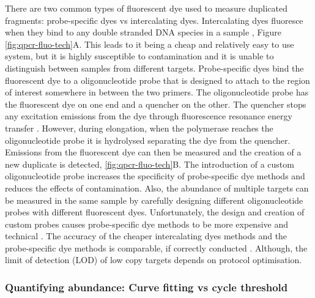\documentclass[../main.tex]{subfiles}
\begin{document}

There are two common types of fluorescent dye used to measure duplicated fragments: probe-specific dyes vs intercalating dyes.
Intercalating dyes fluoresce when they bind to any double stranded DNA species in a sample \parencite{Ihmels2005}, Figure \ref{fig:qpcr-fluo-tech}A.
This leads to it being a cheap and relatively easy to use system, but it is highly susceptible to contamination and it is unable to distinguish between samples from different targets. 
Probe-specific dyes bind the fluorescent dye to a oligonucleotide probe that is designed to attach to the region of interest somewhere in between the two primers. 
The oligonucleotide probe has the fluorescent dye on one end and a quencher on the other.
The quencher stops any excitation emissions from the dye through fluorescence resonance energy transfer \parencite{Juskowiak2010}. 
However, during elongation, when the polymerase reaches the oligonucleotide probe it is hydrolysed separating the dye from the quencher.
Emissions from the fluorescent dye can then be measured and the creation of a new duplicate is detected, \ref{fig:qpcr-fluo-tech}B. 
The introduction of a custom oligonucleotide probe increases the specificity of probe-specific dye methods and reduces the effects of contamination. 
Also, the abundance of multiple targets can be measured in the same sample by carefully designing different oligonucleotide probes with different fluorescent dyes.
Unfortunately, the design and creation of custom probes causes probe-specific dye methods to be more expensive and technical \parencite{Adams2020}. 
The accuracy of the cheaper intercalating dyes methods and the probe-specific dye methods is comparable, if correctly conducted \parencite{Tajadini2014}.
Although, the limit of detection (LOD) of low copy targets depends on protocol optimisation. 

\subsubsection{Quantifying abundance: Curve fitting vs cycle threshold}
\end{document}
